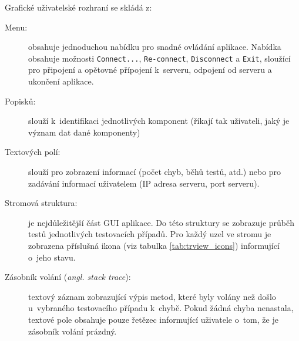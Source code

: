       \noindent Grafické uživatelské rozhraní se skládá z:
      \begin{description}
	 \item[Menu:] obsahuje jednoduchou nabídku pro snadné ovládání aplikace. Nabídka obsahuje možnosti \texttt{Connect...}, \texttt{Re-connect}, \texttt{Disconnect} a \texttt{Exit}, sloužící pro připojení a opětovné přípojení k~serveru, odpojení od serveru a ukončení aplikace.
	 \item[Popisků:] slouží k~identifikaci jednotlivých komponent (říkají tak uživateli, jaký je význam dat dané komponenty)
	 \item[Textových polí:] slouží pro zobrazení informací (počet chyb, běhů testů, atd.) nebo pro zadávání informací uživatelem (IP adresa serveru, port serveru).
	 \item[Stromová struktura:] je nejdůležitější část GUI aplikace. Do této struktury se zobrazuje průběh testů jednotlivých testovacích případů. Pro každý uzel ve stromu je zobrazena příslušná ikona (viz tabulka \ref{tab:trview_icons}) informující o~jeho stavu.
	 \item[Zásobník volání (\emph{angl. stack trace}):] textový záznam zobrazující výpis metod, které byly volány než došlo u~vybraného testovacího případu k~chybě. Pokud žádná chyba nenastala, textové pole obsahuje pouze řetězec informující uživatele o~tom, že je zásobník volání prázdný.
      \end{description}

